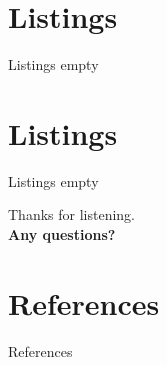 \documentclass[aspectratio=43,t]{beamer}
\begin{document}
  \section{Listings}
  \begin{frame}[fragile]{Listings}
    empty
  \end{frame}
\section{Listings}
\begin{frame}[fragile]{Listings}
  empty
\end{frame}

  { %
    \begin{frame}[c,noframenumbering]
      \begin{center}
        Thanks for listening.\\
        {\bf Any questions?}
      \end{center}
    \end{frame}

    \section*{References}
    \begin{frame}{References}
      \printbibliography
    \end{frame}
  }
\end{document}
